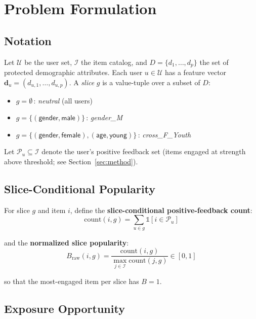 \section{Problem Formulation}
\label{sec:problem}

\subsection{Notation}

Let $\mathcal{U}$ be the user set, $\mathcal{I}$ the item catalog, and $D = \{d_1, \dots, d_p\}$ the set of protected demographic attributes. Each user $u \in \mathcal{U}$ has a feature vector $\mathbf{d}_u = (d_{u,1}, \dots, d_{u,p})$. A \emph{slice} $g$ is a value-tuple over a subset of $D$:
\begin{itemize}
\item $g = \emptyset$\,: \emph{neutral} (all users)
\item $g = \{(\textsf{gender},\textsf{male})\}$\,: \emph{gender\_M}
\item $g = \{(\textsf{gender},\textsf{female}),(\textsf{age},\textsf{young})\}$\,: \emph{cross\_F\_Youth}
\end{itemize}

Let $\mathcal{P}_u \subseteq \mathcal{I}$ denote the user's positive feedback set (items engaged at strength above threshold; see Section~\ref{sec:method}).

\subsection{Slice-Conditional Popularity}

For slice $g$ and item $i$, define the \textbf{slice-conditional positive-feedback count}:
\begin{equation}
\text{count}(i, g) = \sum_{u \in g} \mathbb{1}[i \in \mathcal{P}_u]
\end{equation}

and the \textbf{normalized slice popularity}:
\begin{equation}
B_{\text{raw}}(i, g) = \frac{\text{count}(i, g)}{\max_{j \in \mathcal{I}} \text{count}(j, g)} \in [0, 1]
\end{equation}

so that the most-engaged item per slice has $B = 1$.

\subsection{Exposure Opportunity}

